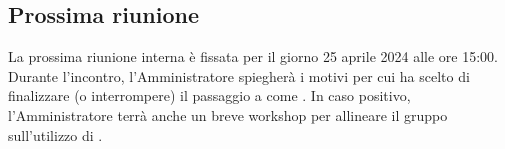\subsection{Prossima riunione}
La prossima riunione interna è fissata per il giorno 25 aprile 2024 alle ore 15:00. Durante l'incontro, l'Amministratore spiegherà i motivi per cui ha scelto di finalizzare (o interrompere) il passaggio a  come . In caso positivo, l'Amministratore terrà anche un breve workshop per allineare il gruppo sull'utilizzo di .